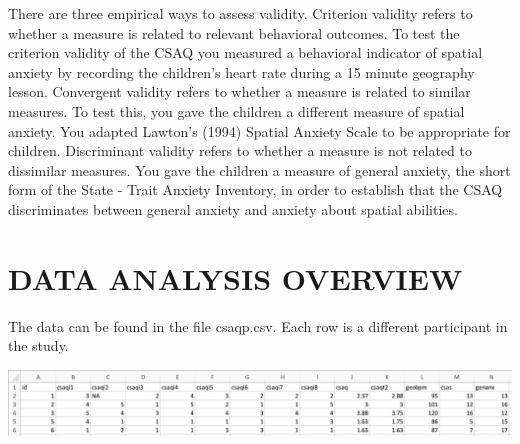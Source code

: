 \documentclass[
]{book}
\begin{document}
There are three empirical ways to assess validity. Criterion validity refers to whether a measure is related to relevant behavioral outcomes. To test the criterion validity of the CSAQ you measured a behavioral indicator of spatial anxiety by recording the children's heart rate during a 15 minute geography lesson. Convergent validity refers to whether a measure is related to similar measures. To test this, you gave the children a different measure of spatial anxiety. You adapted Lawton's (1994) Spatial Anxiety Scale to be appropriate for children. Discriminant validity refers to whether a measure is not related to dissimilar measures. You gave the children a measure of general anxiety, the short form of the State - Trait Anxiety Inventory, in order to establish that the CSAQ discriminates between general anxiety and anxiety about spatial abilities.

\hypertarget{data-analysis-overview-2}{%
\section{DATA ANALYSIS OVERVIEW}\label{data-analysis-overview-2}}

The data can be found in the file csaqp.csv. Each row is a different participant in the study.

\includegraphics{img/4.b.png}
\end{document}
